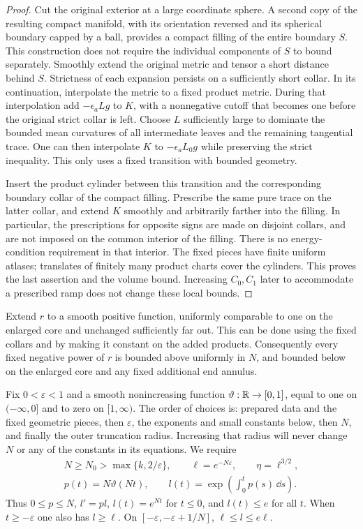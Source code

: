 \begin{proof}
Cut the original exterior at a large coordinate sphere.  A second copy of
the resulting compact manifold, with its orientation reversed and its
spherical boundary capped by a ball, provides a compact filling of the
entire boundary $S$.  This construction does not require the individual
components of $S$ to bound separately.  Smoothly extend the original metric
and tensor a short distance behind $S$.  Strictness of each expansion
persists on a sufficiently short collar.  In its continuation, interpolate
the metric to a fixed product metric.  During that interpolation add
$-\epsilon_a Lg$ to $K$, with a nonnegative cutoff that becomes one before
the original strict collar is left.  Choose $L$ sufficiently large to
dominate the bounded mean curvatures of all intermediate leaves and the
remaining tangential trace.  One can then interpolate $K$ to
$-\epsilon_a L_0g$ while preserving the strict inequality.  This only
uses a fixed transition with bounded geometry.

Insert the product cylinder between this transition and the corresponding
boundary collar of the compact filling.  Prescribe the same pure trace on
the latter collar, and extend $K$ smoothly and arbitrarily farther into
the filling.  In particular, the prescriptions for opposite signs are
made on disjoint collars, and are not imposed on the common interior of
the filling.  There is no energy-condition requirement in that interior.
The fixed pieces have finite uniform atlases; translates of finitely many
product charts cover the cylinders.  This proves the last assertion and
the volume bound.  Increasing $C_0,C_1$ later to accommodate a prescribed
ramp does not change these local bounds.
\end{proof}

Extend $r$ to a smooth positive function, uniformly comparable to one on
the enlarged core and unchanged sufficiently far out.  This can be done
using the fixed collars and by making it constant on the added products.
Consequently every fixed negative power of $r$ is bounded above uniformly
in $N$, and bounded below on the enlarged core and any fixed additional
end annulus.

Fix $0<\varepsilon<1$ and a smooth nonincreasing function
$\vartheta:\mathbb R\to[0,1]$, equal to one on $(-\infty,0]$ and to zero on
$[1,\infty)$.  The order of choices is: prepared data and the fixed
geometric pieces, then $\varepsilon$, the exponents and small constants
below, then $N$, and finally the outer truncation radius.  Increasing
that radius will never change $N$ or any of the constants in its
equations.  We require
\begin{equation}
\begin{gathered}
 N\geq N_0>\max\{k,2/\varepsilon\},\qquad
 \ell=e^{-N\varepsilon},\qquad \eta=\ell^{3/2},\\
 p(t)=N\vartheta(Nt),\qquad
 l(t)=\exp\left(\int_0^t p(s)\,\dd s\right).
\end{gathered}
 \label{alg:profiles}
\end{equation}
Thus $0\leq p\leq N$, $l'=pl$, $l(t)=e^{Nt}$ for $t\leq0$, and
$l(t)\leq e$ for all $t$.  When $t\geq-\varepsilon$ one also has
$l\geq\ell$.  On $[-\varepsilon,-\varepsilon+1/N]$,
$\ell\leq l\leq e\ell$.

